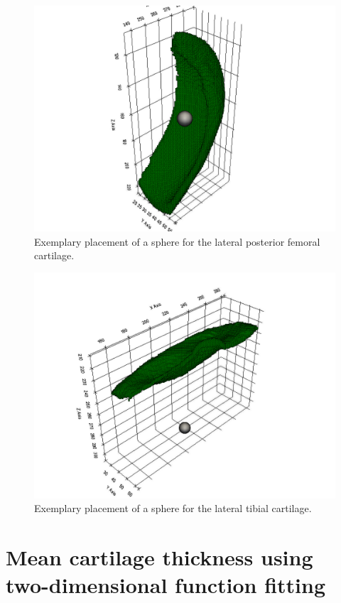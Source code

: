 \begin{figure}[]
	\centering
	\includegraphics[width=\linewidth]{./figures/sphere_placement_femur}
	\caption{Exemplary placement of a sphere for the lateral posterior femoral cartilage.}
	\label{fig:femoral_sphere}
\end{figure}
\begin{figure}[]
	\centering
	\includegraphics[width=\linewidth]{./figures/sphere_placement_tibia}
	\caption{Exemplary placement of a sphere for the lateral tibial cartilage.}
	\label{fig:tibial_sphere}
\end{figure}
\section{Mean cartilage thickness using two-dimensional function fitting}
\label{sec:Function_fitting}
